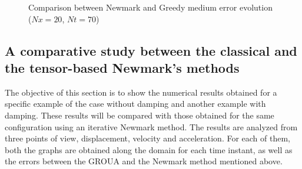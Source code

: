 \documentclass{ws-m3as}
\begin{document}
\begin{figure}
 \centering
  \caption{Comparison between Newmark and Greedy medium error evolution ($Nx=20$, $Nt=70$)}
 \label{MedErrorEvoTime}
\end{figure}







\subsection{A comparative study between the classical and the tensor-based Newmark's methods}

The objective of this section is to show the numerical results obtained for a specific example of the case without damping and another example with damping. These results will be compared with those obtained for the same configuration using an iterative Newmark method. The results are analyzed from three points of view, displacement, velocity and acceleration. For each of them, both the graphs are obtained along the domain for each time instant, as well as the errors between the GROUA and the Newmark method mentioned above.
\end{document}
